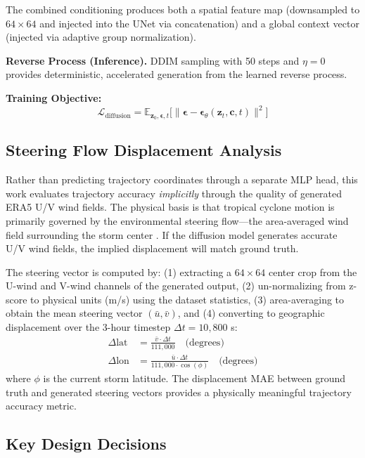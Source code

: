 \documentclass[12pt, a4paper]{article}
\begin{document}
The combined conditioning produces both a spatial feature map (downsampled to $64\times64$ and injected into the UNet via concatenation) and a global context vector (injected via adaptive group normalization).

\textbf{Reverse Process (Inference).} DDIM sampling \cite{song2020denoising} with 50 steps and $\eta = 0$ provides deterministic, accelerated generation from the learned reverse process.

\textbf{Training Objective:}
\begin{equation}
\mathcal{L}_{\text{diffusion}} = \mathbb{E}_{\mathbf{z}_0, \boldsymbol{\epsilon}, t}\Big[\big\|\boldsymbol{\epsilon} - \boldsymbol{\epsilon}_\theta(\mathbf{z}_t, \mathbf{c}, t)\big\|^2\Big]
\end{equation}

\subsection{Steering Flow Displacement Analysis}

Rather than predicting trajectory coordinates through a separate MLP head, this work evaluates trajectory accuracy \textit{implicitly} through the quality of generated ERA5 U/V wind fields. The physical basis is that tropical cyclone motion is primarily governed by the environmental steering flow---the area-averaged wind field surrounding the storm center \cite{chan2005global}. If the diffusion model generates accurate U/V wind fields, the implied displacement will match ground truth.

The steering vector is computed by: (1) extracting a $64 \times 64$ center crop from the U-wind and V-wind channels of the generated output, (2) un-normalizing from z-score to physical units (m/s) using the dataset statistics, (3) area-averaging to obtain the mean steering vector $(\bar{u}, \bar{v})$, and (4) converting to geographic displacement over the 3-hour timestep $\Delta t = 10{,}800$ s:
\begin{align}
\Delta\text{lat} &= \frac{\bar{v} \cdot \Delta t}{111{,}000} \quad \text{(degrees)} \\[4pt]
\Delta\text{lon} &= \frac{\bar{u} \cdot \Delta t}{111{,}000 \cdot \cos(\phi)} \quad \text{(degrees)}
\end{align}
where $\phi$ is the current storm latitude. The displacement MAE between ground truth and generated steering vectors provides a physically meaningful trajectory accuracy metric.

\subsection{Key Design Decisions}
\end{document}
